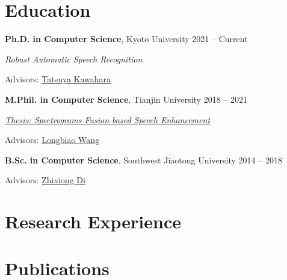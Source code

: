 \documentclass[11pt,letter,sans]{moderncv}
\begin{document}
\hypersetup{allcolors=color1}
\makecvtitle

\vspace{-1cm}

\section{Education}
    \textbf{Ph.D. in Computer Science}, Kyoto University
    \hfill 2021 -- Current \par
\textit{{Robust Automatic Speech Recognition}} \par
Advisors: \href{http://sap.ist.i.kyoto-u.ac.jp/members/kawahara/}{Tatsuya Kawahara} \par
  \vspace{3mm}
    \textbf{M.Phil. in Computer Science}, Tianjin University
    \hfill 2018 -- 2021 \par
\textit{\href{https://github.com/hshi-speech/resume/blob/main/pdf/master_thesis.pdf}{Thesis: Spectrograms Fusion-based Speech Enhancement}} \par
Advisors: \href{http://cic.tju.edu.cn/faculty/wanglongbiao/wang.html}{Longbiao Wang} \par
  \vspace{3mm}
    \textbf{B.Sc. in Computer Science}, Southwest Jiaotong University
    \hfill 2014 -- 2018 \par
Advisors: \href{https://faculty.swjtu.edu.cn/dizhixiong/zh_CN/zhym/129018/list/index.htm}{Zhixiong Di} \par
  \vspace{3mm}
\vspace{-3mm}


\section{Research Experience}


\section{Publications}
\end{document}
